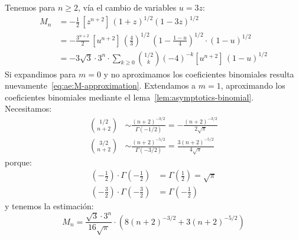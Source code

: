   Tenemos para \(n \ge 2\),
  vía el cambio de variables \(u = 3 z\):
  \begin{align*}
    M_n
      &= - \frac{1}{2} \,
	     \left[ z^{n + 2} \right]
	       \, (1 + z)^{1/2} (1 - 3 z)^{1/2} \\
      &= - \frac{3^{n + 2}}{2} \,
	     \left[ u^{n + 2} \right] \,
	       \left( \frac{4}{3} \right)^{1/2} \,
		 \left( 1 - \frac{1 - u}{4} \right)^{1/2}
	       \cdot (1 - u)^{1/2} \\
      &= - 3 \sqrt{3} \cdot 3^n \cdot
	     \sum_{k \ge 0} \binom{1/2}{k} (-4)^{-k}
	       \left[ u^{n + 2} \right] \, (1 - u)^{1/2}
  \end{align*}
  Si expandimos para \(m = 0\)
  y no aproximamos los coeficientes binomiales
  resulta nuevamente~\eqref{eq:ae:M-approximation}.
  Extendamos a \(m = 1\),
  aproximando los coeficientes binomiales
  mediante el lema~\ref{lem:asymptotics-binomial}.%
  Necesitamos:
  \begin{align*}
    \binom{1/2}{n + 2}
      &\sim \frac{(n + 2)^{-3/2}}{\Gamma(-1/2)}
       =    - \frac{(n + 2)^{-3/2}}{2 \sqrt{\pi}} \\
    \binom{3/2}{n + 2}
      &\sim \frac{(n + 2)^{-5/2}}{\Gamma(-3/2)}
       =    \frac{3 (n + 2)^{-5/2}}{4 \sqrt{\pi}}
  \end{align*}
  porque:
  \begin{align*}
    \left( - \frac{1}{2} \right)
	\cdot \Gamma \left( - \frac{1}{2} \right)
      &= \Gamma \left( \frac{1}{2} \right)
      = \sqrt{\pi} \\
    \left( - \frac{3}{2} \right)
       \cdot \Gamma \left( - \frac{3}{2} \right)
      &= \Gamma \left( - \frac{1}{2} \right)
  \end{align*}
  y tenemos la estimación:
  \begin{equation}
    \label{eq:ae:M-approximation-2}
    M_n
      = \frac{\sqrt{3} \cdot 3^n}{16 \sqrt{\pi}} \cdot
	  \left(
	    8 (n + 2)^{-3/2} + 3 (n + 2)^{-5/2}
	  \right)
  \end{equation}
